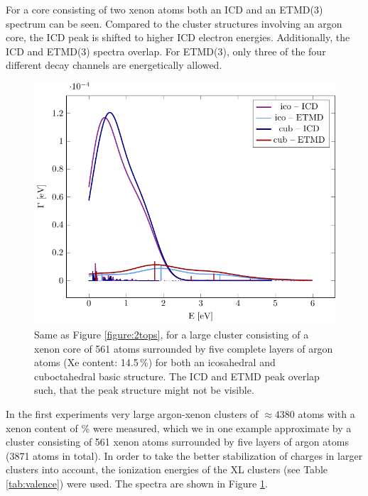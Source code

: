 For a core consisting of two xenon atoms both an ICD and an ETMD(3) spectrum
can be seen. Compared to the cluster structures involving an argon core, the ICD peak is
shifted to higher ICD electron energies. 
Additionally, the ICD and ETMD(3) spectra overlap.
For ETMD(3), only three of the four different decay channels are
energetically allowed.

\begin{figure}[ht]
 \centering
 \includegraphics[width=\columnwidth]{pics/c6l5.pdf}
 \caption{Same as Figure \protect\ref{figure:2tops},
          for a large cluster consisting
          of a xenon core of 561 atoms surrounded by five complete layers of
          argon atoms (Xe content: 14.5\,\%) for both an icosahedral and
          cuboctahedral basic structure.
          The ICD and ETMD peak overlap such, that the peak
          structure might not be visible.}
 \label{figure:xe_6_lay5}
\end{figure}
%
In the first experiments very large argon-xenon clusters of 
$\approx 4380$ atoms with a xenon content of \unit[19]{\%}
were measured,\cite{Mucke_phd}
which we in one example approximate by a cluster consisting of 561 xenon
atoms surrounded
by five layers of argon atoms (3871 atoms in total). In order to take the
better stabilization of charges in larger clusters into account, the
ionization energies of the XL clusters (see Table \ref{tab:valence})
were used.
The spectra are shown in 
Figure \ref{figure:xe_6_lay5}.

